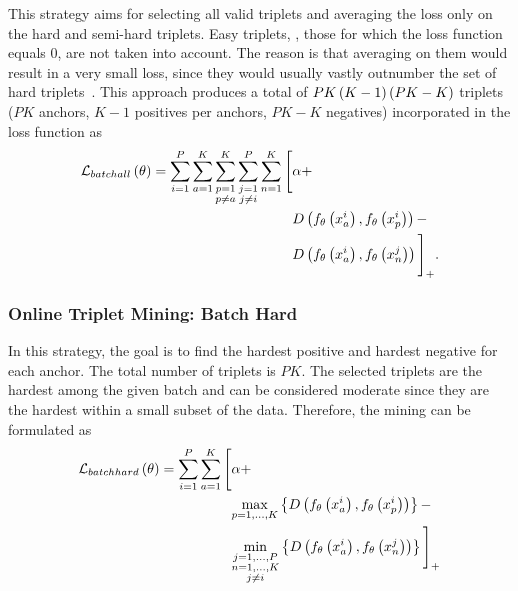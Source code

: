 This strategy aims for selecting all valid triplets and averaging the loss only on the hard and semi-hard triplets. Easy triplets, \ietext{}, those for which the loss function equals $0$, are not taken into account. The reason is that averaging on them would result in a very small loss, since they would usually vastly outnumber the set of hard triplets~\cite{hermans2017triplet}. This approach produces a total of $PK \left( {K - 1} \right) \left( {PK - K} \right)$ triplets ($PK$ anchors, $K - 1$ positives per anchors, $PK - K$ negatives) incorporated in the loss function as
\begin{equation}
    \label{eq:BatchAllLossFunction}
    \begin{aligned}
        {\mathcal{L}_{batchall}} \left( \theta \right) =
        \sum_{i = 1}^P
        \sum_{a = 1}^K
        \sum_{\substack{p = 1 \\p \neq a}}^K
        \sum_{\substack{j = 1 \\j \neq i}}^P
        \sum_{n = 1}^K
        \Bigg[
         & \alpha +           \\
         & {D} \left( 
            {f_\theta} \left( x_a^i \right),
            {f_\theta} \left( x_p^i \right)
         \right) -                   \\
         & {D} \left( 
            {f_\theta} \left( x_a^i \right),
            {f_\theta} \left( x_n^j \right)
         \right)
        {\Bigg]}_{+}.
    \end{aligned}
\end{equation}

\subsubsection{Online Triplet Mining: Batch Hard}

In this strategy, the goal is to find the hardest positive and hardest negative for each anchor. The total number of triplets is $PK$. The selected triplets are the hardest among the given batch and can be considered moderate since they are the hardest within a small subset of the data. Therefore, the mining can be formulated as
\begin{equation}
    \label{eq:BatchHardMining}
    \begin{aligned}
        {\mathcal{L}_{batchhard}} \left( \theta \right) =
        \sum_{i = 1}^P
        \sum_{a = 1}^K
        \Bigg[
         & \alpha +                            \\
         & \underset{p = 1, \dots, K} {\max}
        \left\{ {
            {D} \left( 
                {f_\theta} \left( x_a^i \right),
                {f_\theta} \left( x_p^i \right)
             \right)
        } \right\} -                                    \\
         & \underset{\substack{j = 1, \dots, P \\n = 1, \dots, K\\j \neq i}} {\min}
        \left\{ {
            {D} \left( 
                {f_\theta} \left( x_a^i \right),
                {f_\theta} \left( x_n^j \right)
             \right)
        } \right\}
        {\Bigg]}_{+}
    \end{aligned}
\end{equation}
